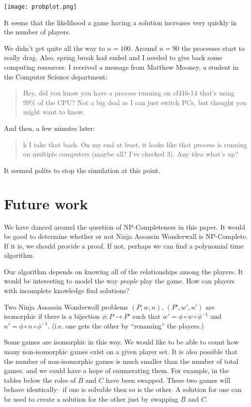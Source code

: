 \documentclass[12pt,x11names, rgb]{article}
\begin{document}
    \begin{center}
    \texttt{[image: probplot.png]}
    \end{center}

    It seems that the likelihood a game having a solution increases very quickly in the number of players.

    We didn't get quite all the way to $n=100$. Around $n=90$ the processes start to really drag. Also, spring break had ended and I needed to give back some computing resources. I received a message from Matthew Mooney, a student in the Computer Science department:
    \begin{quote}
    Hey, did you know you have a process running on cf416-14 that's using 99\% of the CPU? Not a big deal as I can just switch PCs, but thought you might want to know.
    \end{quote}
    And then, a few minutes later:
    \begin{quote}
    k I take that back. On my end at least, it looks like that process is running on multiple computers (maybe all? I've checked 3). Any idea what's up?
    \end{quote}

    It seemed polite to stop the simulation at this point.

\section{Future work}
    \label{sec:future-work}
    We have danced around the question of NP-Completeness in this paper. It would be good to determine whether or not Ninja Assassin Wonderwall is NP-Complete. If it is, we should provide a proof. If not, perhaps we can find a polynomial time algorithm.

    Our algorithm depends on knowing all of the relationships among the players. It would be interesting to model the way \emph{people} play the game. How can players with incomplete knowledge find solutions?

 Two Ninja Assassin Wonderwall problems $(P,w,n)$, $(P', w', n')$ are isomorphic if there is a bijection $\phi: P\to P'$ such that $w'=\phi\circ w\circ \phi^{-1}$ and $n'=\phi\circ n\circ \phi^{-1}$.  (i.e. one gets the other by ``renaming'' the players.)

    Some games are isomorphic in this way. We would like to be able to count how many non-isomorphic games exist on a given player set. It is also possible that the number of non-isomorphic games is much smaller than the number of total games. and we could have a hope of enumerating them. For example, in the tables below the roles of $B$ and $C$ have been swapped. These two games will behave identically-- if one is solvable then so is the other. A solution for one can be used to create a solution for the other just by swapping $B$ and $C$.
\end{document}
